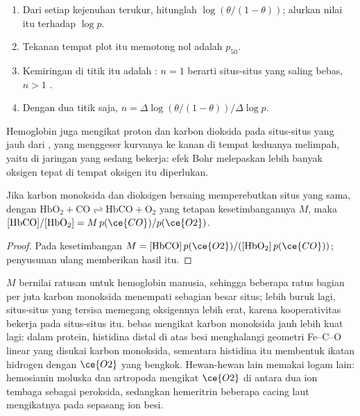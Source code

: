 \begin{method}\label{met:b3:bioinorganic:hill-plot}
\begin{enumerate}
  \item Dari setiap kejenuhan terukur, hitunglah $\log(\theta/(1 - \theta))$; alurkan nilai itu terhadap $\log p$.
  \item Tekanan tempat plot itu memotong nol adalah $p_{50}$.
  \item Kemiringan di titik itu adalah : $n = 1$ berarti situs-situs yang saling
        bebas, $n > 1$ .
  \item Dengan dua titik saja, $n = \Delta\log(\theta/(1 - \theta))/\Delta\log p$.
\end{enumerate}
\end{method}

Hemoglobin juga mengikat proton dan karbon dioksida pada situs-situs yang jauh dari ,
yang menggeser kurvanya ke kanan di tempat keduanya melimpah, yaitu di jaringan yang sedang bekerja:
efek Bohr melepaskan lebih banyak oksigen tepat di tempat oksigen itu diperlukan.

\begin{proposition}\label{prop:b3:bioinorganic:haldane}
Jika karbon monoksida dan dioksigen bersaing memperebutkan situs yang sama, dengan
$\mathrm{HbO_2 + CO \rightleftharpoons HbCO + O_2}$ yang tetapan kesetimbangannya $M$, maka
$[\mathrm{HbCO}]/[\mathrm{HbO_2}] = M\,p(\ce{CO})/p(\ce{O2})$.
\end{proposition}

\begin{proof}
Pada kesetimbangan $M = [\mathrm{HbCO}]\,p(\ce{O2})/([\mathrm{HbO_2}]\,p(\ce{CO}))$; penyusunan ulang memberikan hasil itu.
\end{proof}

$M$ bernilai ratusan untuk hemoglobin manusia, sehingga beberapa ratus bagian per
juta karbon monoksida menempati sebagian besar situs; lebih buruk lagi,
situs-situs yang tersisa memegang oksigennya lebih erat, karena kooperativitas
bekerja pada situs-situs itu.  bebas mengikat karbon monoksida jauh lebih kuat lagi: dalam
protein, histidina distal di atas besi menghalangi geometri Fe--C--O linear
yang disukai karbon monoksida, sementara histidina itu membentuk ikatan hidrogen dengan $\ce{O2}$ yang bengkok.
Hewan-hewan lain memakai logam lain: hemosianin moluska dan artropoda
mengikat $\ce{O2}$ di antara dua ion tembaga sebagai peroksida, sedangkan hemeritrin beberapa cacing
laut mengikatnya pada sepasang ion besi.

